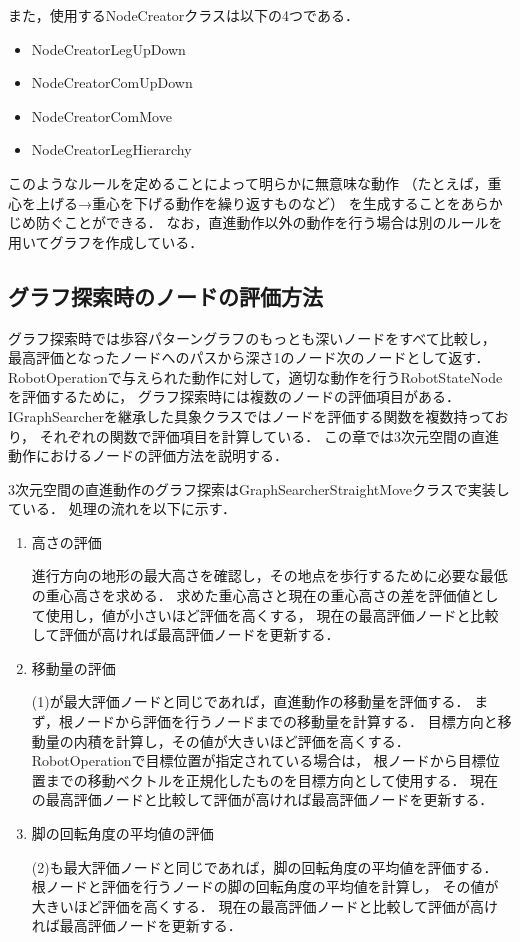 \noindent また，使用するNodeCreatorクラスは以下の4つである．

\begin{itemize}
  \item NodeCreatorLegUpDown
  \item NodeCreatorComUpDown
  \item NodeCreatorComMove
  \item NodeCreatorLegHierarchy
\end{itemize}

このようなルールを定めることによって明らかに無意味な動作
（たとえば，重心を上げる→重心を下げる動作を繰り返すものなど）
を生成することをあらかじめ防ぐことができる．
なお，直進動作以外の動作を行う場合は別のルールを用いてグラフを作成している．

\subsection{グラフ探索時のノードの評価方法}
グラフ探索時では歩容パターングラフのもっとも深いノードをすべて比較し，
最高評価となったノードへのパスから深さ1のノード次のノードとして返す．
RobotOperationで与えられた動作に対して，適切な動作を行うRobotStateNodeを評価するために，
グラフ探索時には複数のノードの評価項目がある．
IGraphSearcherを継承した具象クラスではノードを評価する関数を複数持っており，
それぞれの関数で評価項目を計算している．
この章では3次元空間の直進動作におけるノードの評価方法を説明する．

3次元空間の直進動作のグラフ探索はGraphSearcherStraightMoveクラスで実装している．
処理の流れを以下に示す．

\begin{enumerate}
  \item 高さの評価\par
        進行方向の地形の最大高さを確認し，その地点を歩行するために必要な最低の重心高さを求める．
        求めた重心高さと現在の重心高さの差を評価値として使用し，値が小さいほど評価を高くする，
        現在の最高評価ノードと比較して評価が高ければ最高評価ノードを更新する．
  \item 移動量の評価\par
        (1)が最大評価ノードと同じであれば，直進動作の移動量を評価する．
        まず，根ノードから評価を行うノードまでの移動量を計算する．
        目標方向と移動量の内積を計算し，その値が大きいほど評価を高くする．
        RobotOperationで目標位置が指定されている場合は，
        根ノードから目標位置までの移動ベクトルを正規化したものを目標方向として使用する．
        現在の最高評価ノードと比較して評価が高ければ最高評価ノードを更新する．        
  \item 脚の回転角度の平均値の評価\par
        (2)も最大評価ノードと同じであれば，脚の回転角度の平均値を評価する．
        根ノードと評価を行うノードの脚の回転角度の平均値を計算し，
        その値が大きいほど評価を高くする．
        現在の最高評価ノードと比較して評価が高ければ最高評価ノードを更新する．
\end{enumerate}

